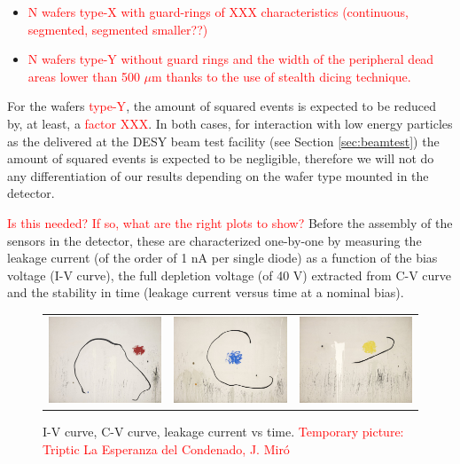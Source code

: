 \documentclass[a4paper,11pt]{article}
\newcommand{\todo}[1]{\textcolor{red}{{#1}}}
\begin{document}
\begin{itemize}
\item \todo{N wafers type-X with guard-rings of XXX characteristics (continuous, segmented, segmented smaller??)}
\item \todo{N wafers type-Y without guard rings and the width of the peripheral dead areas lower than 500 $\mu$m thanks to the use of stealth dicing technique.}
\end{itemize}

For the wafers \todo{type-Y}, the amount of squared events is expected to be reduced by, at least, a \todo{factor XXX}. In both cases, 
for interaction with low energy particles as the delivered at the DESY beam test facility (see Section \ref{sec:beamtest}) the
amount of squared events is expected to be negligible, therefore we will not do any differentiation 
of our results depending on the wafer type mounted in the detector.

\todo{ Is this needed? If so, what are the right plots to show?} Before the assembly of the sensors in the detector, these are characterized one-by-one by measuring the leakage current (of the order of 1 nA per single diode) 
as a function of the bias voltage (I-V curve), the full depletion voltage (of 40 V) extracted from C-V curve and
the stability in time (leakage current versus time at a nominal bias).

\begin{figure}[!t]
\centering
\begin{tabular}{lll}
  \includegraphics[width=1.8in]{figs/test.jpg} &
  \includegraphics[width=1.8in]{figs/test2.jpg} &
  \includegraphics[width=1.8in]{figs/test3.jpg}
\end{tabular}
\caption{I-V curve, C-V curve, leakage current vs time. \todo{Temporary picture: Triptic La Esperanza del Condenado, J. Miró}}
\label{shortslab}
\end{figure}
\end{document}
